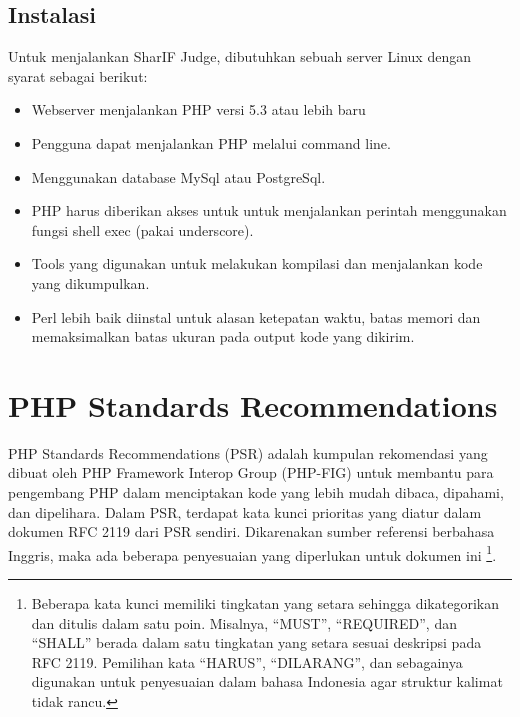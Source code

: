 \subsection{Instalasi}
Untuk menjalankan SharIF Judge, dibutuhkan sebuah server Linux dengan syarat sebagai berikut:
\begin{itemize}
	\item Webserver menjalankan PHP versi 5.3 atau lebih baru
	\item Pengguna dapat menjalankan PHP melalui command line.
	\item Menggunakan database MySql atau PostgreSql.
	\item PHP harus diberikan akses untuk untuk menjalankan perintah menggunakan fungsi shell exec (pakai underscore).
	\item Tools yang digunakan untuk melakukan kompilasi dan menjalankan kode yang dikumpulkan.
	\item Perl lebih baik diinstal untuk alasan ketepatan waktu, batas memori dan memaksimalkan batas ukuran pada output kode yang dikirim.
\end{itemize}




\section{PHP Standards Recommendations}
\label{sec:psr}

PHP Standards Recommendations (PSR) adalah kumpulan rekomendasi yang dibuat oleh PHP Framework Interop Group (PHP-FIG) untuk membantu para pengembang PHP dalam menciptakan kode yang lebih mudah dibaca, dipahami, dan dipelihara. 
Dalam PSR, terdapat kata kunci prioritas yang diatur dalam dokumen RFC 2119 \cite{RFC2119} dari PSR sendiri. Dikarenakan sumber referensi berbahasa Inggris, maka ada beberapa penyesuaian yang diperlukan untuk dokumen ini \footnote{Beberapa kata kunci memiliki tingkatan yang setara sehingga dikategorikan dan ditulis dalam satu poin. Misalnya, ``MUST'', ``REQUIRED'', dan ``SHALL'' berada dalam satu tingkatan yang setara sesuai deskripsi pada RFC 2119. Pemilihan kata ``HARUS'', ``DILARANG'', dan sebagainya digunakan untuk penyesuaian dalam bahasa Indonesia agar struktur kalimat tidak rancu.}.

